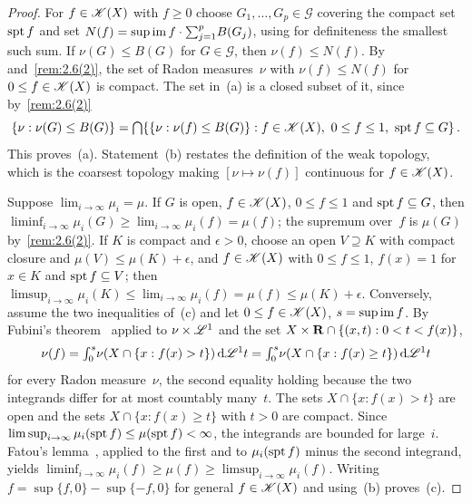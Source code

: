 \begin{proof}
    For $f \in \mathscr{K}(X)$ with $f \ge 0$ choose $G_1, \ldots, G_p \in \mathcal{G}$ covering
    the compact set $\operatorname{spt} f$ and set $N(f) = \sup \operatorname{im} f \cdot {\textstyle\sum_{j=1}^{p}} B(G_j)$, using
    for definiteness the smallest such sum. If $\nu(G) \le B(G)$ for $G \in \mathcal{G}$, then
    $\nu(f) \le N(f)$. By~\cite[2.5.19]{Federer1969} and~\ref{rem:2.6(2)}, the set of Radon
    measures~$\nu$ with $\nu(f) \le N(f)$ for $0 \le f \in \mathscr{K}(X)$ is compact. The set in~(a)
    is a closed subset of it, since by~\ref{rem:2.6(2)}
    \begin{displaymath}
        \{ \nu : \nu(G) \le B(G) \} = {{\textstyle \bigcap}} \{ \{ \nu : \nu(f) \le B(G) \} : f \in
        \mathscr{K}(X),\ 0 \le f \le 1,\ \operatorname{spt} f \subseteq G \} \,.
    \end{displaymath}
    This proves~(a). Statement~(b) restates the definition of the weak topology, which is the
    coarsest topology making $[\nu \mapsto \nu(f)]$ continuous for $f \in \mathscr{K}(X)$.

    Suppose $\lim_{i \to \infty} \mu_i = \mu$. If $G$ is open, $f \in \mathscr{K}(X)$, $0 \le f
    \le 1$ and $\operatorname{spt} f \subseteq G$, then $\liminf_{i \to \infty} \mu_i(G) \ge \lim_{i \to \infty}
    \mu_i(f) = \mu(f)$; the supremum over~$f$ is $\mu(G)$ by~\ref{rem:2.6(2)}. If $K$ is compact
    and $\epsilon > 0$, choose an open $V \supseteq K$ with compact closure and $\mu(V) \le \mu(K)
    + \epsilon$, and $f \in \mathscr{K}(X)$ with $0 \le f \le 1$, $f(x) = 1$ for $x \in K$ and $\operatorname{spt} f
    \subseteq V$; then $\limsup_{i \to \infty} \mu_i(K) \le \lim_{i \to \infty} \mu_i(f) =
    \mu(f) \le \mu(K) + \epsilon$. Conversely, assume the two inequalities of~(c) and let $0 \le f
    \in \mathscr{K}(X)$, $s = \sup \operatorname{im} f$. By Fubini's theorem~\cite[2.6.2]{Federer1969} applied
    to $\nu \times \mathscr{L}^1$ and the set $X \times \mathbf{R} \cap \{ (x,t) : 0 < t < f(x) \}$,
    \begin{displaymath}
        \nu(f) = {\textstyle\int_{0}^{s}} \nu(X \cap \{ x : f(x) > t \}) \,\mathrm{d} \mathscr{L}^1 t = {\textstyle\int_{0}^{s}} \nu(X
        \cap \{ x : f(x) \ge t \}) \,\mathrm{d} \mathscr{L}^1 t
    \end{displaymath}
    for every Radon measure~$\nu$, the second equality holding because the two integrands
    differ for at most countably many~$t$. The sets $X \cap \{ x : f(x) > t \}$ are open and the
    sets $X \cap \{ x : f(x) \ge t \}$ with $t > 0$ are compact. Since $\limsup_{i \to \infty}
    \mu_i(\operatorname{spt} f) \le \mu(\operatorname{spt} f) < \infty$, the integrands are bounded for large~$i$. Fatou's
    lemma~\cite[2.4.6]{Federer1969}, applied to the first and to $\mu_i(\operatorname{spt} f)$ minus the second
    integrand, yields $\liminf_{i \to \infty} \mu_i(f) \ge \mu(f) \ge \limsup_{i \to \infty}
    \mu_i(f)$. Writing $f = \sup\{f,0\} - \sup\{-f,0\}$ for general $f \in \mathscr{K}(X)$ and
    using~(b) proves~(c).


\end{proof}
